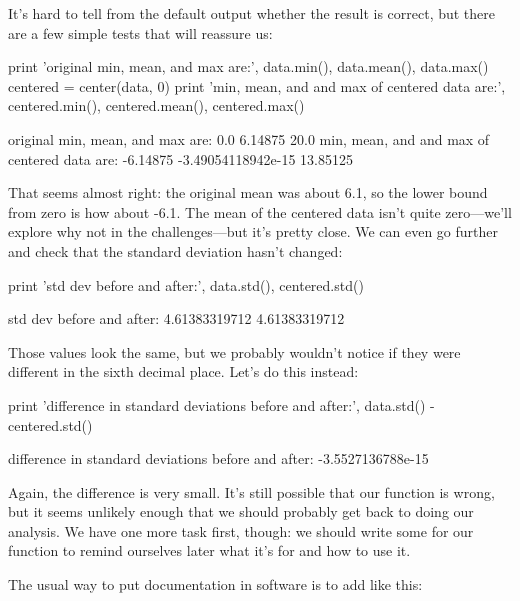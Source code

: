 \documentclass{book}
\begin{document}
It's hard to tell from the default output whether the result is correct,
but there are a few simple tests that will reassure us:

\begin{VerbIn}
print 'original min, mean, and max are:', data.min(), data.mean(), data.max()
centered = center(data, 0)
print 'min, mean, and and max of centered data are:', centered.min(), centered.mean(), centered.max()
\end{VerbIn}

\begin{VerbOut}
original min, mean, and max are: 0.0 6.14875 20.0
min, mean, and and max of centered data are: -6.14875 -3.49054118942e-15 13.85125
\end{VerbOut}

That seems almost right: the original mean was about 6.1, so the lower
bound from zero is how about -6.1. The mean of the centered data isn't
quite zero---we'll explore why not in the challenges---but it's pretty
close. We can even go further and check that the standard deviation
hasn't changed:

\begin{VerbIn}
print 'std dev before and after:', data.std(), centered.std()
\end{VerbIn}

\begin{VerbOut}
std dev before and after: 4.61383319712 4.61383319712
\end{VerbOut}

Those values look the same, but we probably wouldn't notice if they were
different in the sixth decimal place. Let's do this instead:

\begin{VerbIn}
print 'difference in standard deviations before and after:', data.std() - centered.std()
\end{VerbIn}

\begin{VerbOut}
difference in standard deviations before and after: -3.5527136788e-15
\end{VerbOut}

Again, the difference is very small. It's still possible that our
function is wrong, but it seems unlikely enough that we should probably
get back to doing our analysis. We have one more task first, though: we
should write some  for our
function to remind ourselves later what it's for and how to use it.

The usual way to put documentation in software is to add
 like this:
\end{document}
